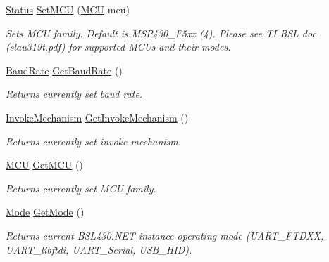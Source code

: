\begin{DoxyCompactItemize}
\mbox{\hyperlink{class_b_s_l430___n_e_t_1_1_status}{Status}} \mbox{\hyperlink{interface_b_s_l430___n_e_t_1_1_i_bsl430_net_ab73461fb74eb2d85fd06ece052558b0d}{Set\+M\+CU}} (\mbox{\hyperlink{namespace_b_s_l430___n_e_t_a2cdaa65be7e1679fc8ca77610b19a490}{M\+CU}} mcu)
\begin{DoxyCompactList}\small\item\em Sets M\+CU family. Default is M\+S\+P430\+\_\+\+F5xx (4). Please see TI B\+SL doc (slau319t.\+pdf) for supported M\+C\+Us and their modes. \end{DoxyCompactList}\item 
\mbox{\hyperlink{namespace_b_s_l430___n_e_t_a8d30c263598635a481840944d38aeb70}{Baud\+Rate}} \mbox{\hyperlink{interface_b_s_l430___n_e_t_1_1_i_bsl430_net_a96d263e6860582cd135b5d5ac90d792a}{Get\+Baud\+Rate}} ()
\begin{DoxyCompactList}\small\item\em Returns currently set baud rate. \end{DoxyCompactList}\item 
\mbox{\hyperlink{namespace_b_s_l430___n_e_t_a6571fdf0fbbc8408b8428f4d642c1305}{Invoke\+Mechanism}} \mbox{\hyperlink{interface_b_s_l430___n_e_t_1_1_i_bsl430_net_a2b6319eca4ebe15b214212e719c4ddb5}{Get\+Invoke\+Mechanism}} ()
\begin{DoxyCompactList}\small\item\em Returns currently set invoke mechanism. \end{DoxyCompactList}\item 
\mbox{\hyperlink{namespace_b_s_l430___n_e_t_a2cdaa65be7e1679fc8ca77610b19a490}{M\+CU}} \mbox{\hyperlink{interface_b_s_l430___n_e_t_1_1_i_bsl430_net_ad9efb6c8632e8bd971f34d58ccdeea4b}{Get\+M\+CU}} ()
\begin{DoxyCompactList}\small\item\em Returns currently set M\+CU family. \end{DoxyCompactList}\item 
\mbox{\hyperlink{namespace_b_s_l430___n_e_t_aa1c6981cb6f279b5491d861ca555a1d7}{Mode}} \mbox{\hyperlink{interface_b_s_l430___n_e_t_1_1_i_bsl430_net_abde671fd1ec4d013dd7fe5902f04ee97}{Get\+Mode}} ()
\begin{DoxyCompactList}\small\item\em Returns current B\+S\+L430.\+N\+ET instance operating mode (U\+A\+R\+T\+\_\+\+F\+T\+D\+XX, U\+A\+R\+T\+\_\+libftdi, U\+A\+R\+T\+\_\+\+Serial, U\+S\+B\+\_\+\+H\+ID). \end{DoxyCompactList}\end{DoxyCompactItemize}

